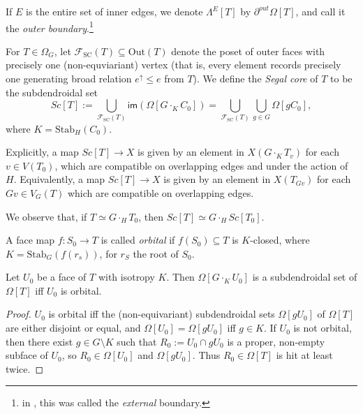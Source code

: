 \documentclass[a4paper,10pt,draft]{article}%
\numberwithin{equation}{section}%
\numberwithin{figure}{section}
\begin{document}
\begin{remark}
      If $E$ is the entire set of inner edges, we denote $\Lambda^{E}[T]$ by $\partial^{out}\Omega[T]$,
      and call it the \textit{outer boundary}.\footnote{
        in \cite{CM13a}, this was called the \textit{external} boundary.}
\end{remark}

\begin{definition}
      For $T \in \Omega_G$, let $\mathscr{F}_{\mathrm{SC}}(T) \subseteq \mathrm{Out}(T)$ denote the poset of outer faces
      with precisely one (non-equviariant) vertex
      (that is, every element records precisely one generating broad relation
      $e^\uparrow \leq e$ from $T$).
      We define the \textit{Segal core} of $T$ to be the subdendroidal set
      \begin{equation}
            Sc[T] := \mathop{\bigcup}\limits_{\mathscr{F}_{\mathrm{SC}}(T)}\mathsf{im}\left(\Omega[G \cdot_K C_0]\right)
            = \mathop{\bigcup}\limits_{\mathscr{F}_{\mathrm{SC}}(T)}\mathop{\bigcup}\limits_{g \in G}\Omega[g C_0],
      \end{equation}
      where $K = \mathrm{Stab}_H(C_0)$. 
\end{definition}

\begin{remark}
      Explicitly, a map $Sc[T] \to X$ is given by an element in $X(G \cdot_K T_v)$ for each $v \in V(T_0)$,
      which are compatible on overlapping edges and under the action of $H$.
      Equivalently, a map $Sc[T] \to X$ is given by an element in $X(T_{G v})$ for each $G v \in V_G(T)$
      which are compatible on overlapping edges.
\end{remark}

\begin{remark}
      We observe that, if $T \simeq G \cdot_H T_0$, then
      $Sc[T] \simeq G \cdot_H Sc[T_0]$.
\end{remark}


\begin{definition}
      A face map $f: S_0 \to T$ is called \textit{orbital} if
      $f(S_0) \subseteq T$ is $K$-closed, where $K = \mathrm{Stab}_G(f(r_s))$, for $r_S$ the root of $S_0$.
\end{definition}


\begin{lemma}
      \label{ORB_INJ_THM}
      Let $U_0$ be a face of $T$ with isotropy $K$.
      Then $\Omega[G \cdot_K U_0]$ is a subdendroidal set of $\Omega[T]$
      iff
      $U_0$ is orbital.
\end{lemma}
\begin{proof}
      $U_0$ is orbital iff the (non-equivariant) subdendroidal sets $\Omega[g U_0]$ of $\Omega[T]$ are either
      disjoint or equal, and $\Omega[U_0] = \Omega[g U_0]$ iff $g \in K$.
      If $U_0$ is not orbital, then there exist $g \in G \setminus K$ such that
      $R_0 := U_0 \cap g U_0$ is a proper, non-empty subface of $U_0$, so $R_0 \in \Omega[U_0]$ and $\Omega[g U_0]$.
      Thus $R_0 \in \Omega[T]$ is hit at least twice.
\end{proof}
\end{document}
